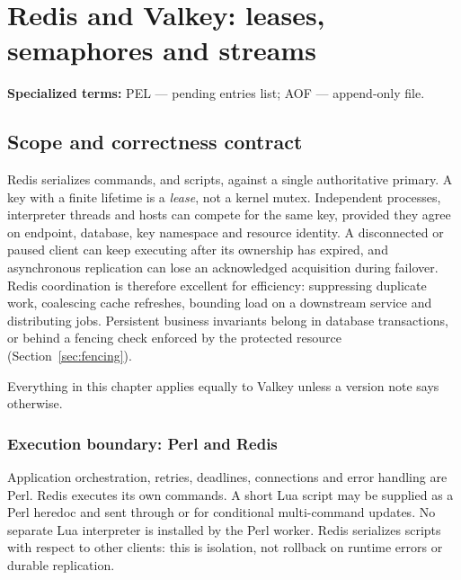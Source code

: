 \chapter{Redis and Valkey: leases, semaphores and streams}\label{ch:redis}
\par\smallskip\noindent\textbf{Specialized terms:} PEL --- pending entries list; AOF --- append-only file.\par\smallskip

\section{Scope and correctness contract}
Redis serializes commands, and scripts, against a single authoritative primary. A key with a finite lifetime is a \emph{lease}, not a kernel mutex. Independent processes, interpreter threads and hosts can compete for the same key, provided they agree on endpoint, database, key namespace and resource identity. A disconnected or paused client can keep executing after its ownership has expired, and asynchronous replication can lose an acknowledged acquisition during failover. Redis coordination is therefore excellent for efficiency: suppressing duplicate work, coalescing cache refreshes, bounding load on a downstream service and distributing jobs. Persistent business invariants belong in database transactions, or behind a fencing check enforced by the protected resource (Section~\ref{sec:fencing}).

Everything in this chapter applies equally to Valkey unless a version note says otherwise.

\subsection{Execution boundary: Perl and Redis}
Application orchestration, retries, deadlines, connections and error handling are Perl. Redis executes its own commands. A short Lua script may be supplied as a Perl heredoc and sent through  or  for conditional multi-command updates. No separate Lua interpreter is installed by the Perl worker. Redis serializes scripts with respect to other clients: this is isolation, not rollback on runtime errors or durable replication.

